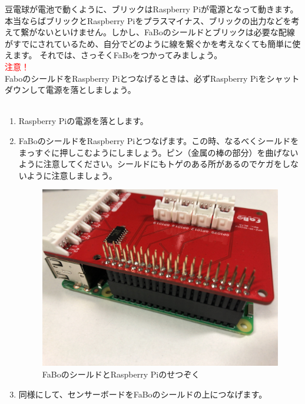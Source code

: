 豆電球が電池で動くように、ブリックはRaspberry Piが電源となって動きます。本当ならばブリックとRaspberry Piをプラスマイナス、ブリックの出力などを考えて繋がないといけません。しかし、FaBoのシールドとブリックは必要な配線がすでにされているため、自分でどのように線を繋ぐかを考えなくても簡単に使えます。
それでは、さっそくFaBoをつかってみましょう。\\

{\Large\textcolor{red}{注意！}}\\
FaboのシールドをRaspberry Piとつなげるときは、必ずRaspberry Piをシャットダウンして電源を落としましょう。\\
\\
\begin{enumerate}
\item Raspberry Piの電源を落とします。\\
\item FaBoのシールドをRaspberry Piとつなげます。この時、なるべくシールドをまっすぐに押しこむようにしましょう。ピン（金属の棒の部分）を曲げないように注意してください。シールドにもトゲのある所があるのでケガをしないように注意しましょう。\\
\begin{figure}[H]
 \centering
 \includegraphics[width=\hsize/2]{images/chap05/text05-img006.jpg}
 \caption{FaBoのシールドとRaspberry Piのせつぞく}
\end{figure}
\item 同様にして、センサーボードをFaBoのシールドの上につなげます。\\
\begin{figure}[H]
 \centering

\end{figure}
\end{enumerate}
